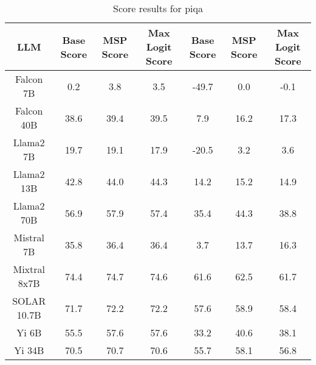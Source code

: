 \renewcommand\arraystretch{1.2}
\begin{table*}
\centering
\begin{tabular}{c|c|c|c|c|c|c}
LLM & Base Score & MSP Score & Max Logit Score & Base Score & MSP Score & Max Logit Score\\ \hline
Falcon 7B & 0.2 & 3.8 & 3.5 & -49.7 & 0.0 & -0.1\\
Falcon 40B & 38.6 & 39.4 & 39.5 & 7.9 & 16.2 & 17.3\\
Llama2 7B & 19.7 & 19.1 & 17.9 & -20.5 & 3.2 & 3.6\\
Llama2 13B & 42.8 & 44.0 & 44.3 & 14.2 & 15.2 & 14.9\\
Llama2 70B & 56.9 & 57.9 & 57.4 & 35.4 & 44.3 & 38.8\\
Mistral 7B & 35.8 & 36.4 & 36.4 & 3.7 & 13.7 & 16.3\\
Mixtral 8x7B & 74.4 & 74.7 & 74.6 & 61.6 & 62.5 & 61.7\\
SOLAR 10.7B & 71.7 & 72.2 & 72.2 & 57.6 & 58.9 & 58.4\\
Yi 6B & 55.5 & 57.6 & 57.6 & 33.2 & 40.6 & 38.1\\
Yi 34B & 70.5 & 70.7 & 70.6 & 55.7 & 58.1 & 56.8\\
\hline
\end{tabular}
\caption{Score results for piqa}
\end{table*}
\label{tab:piqa_score}
